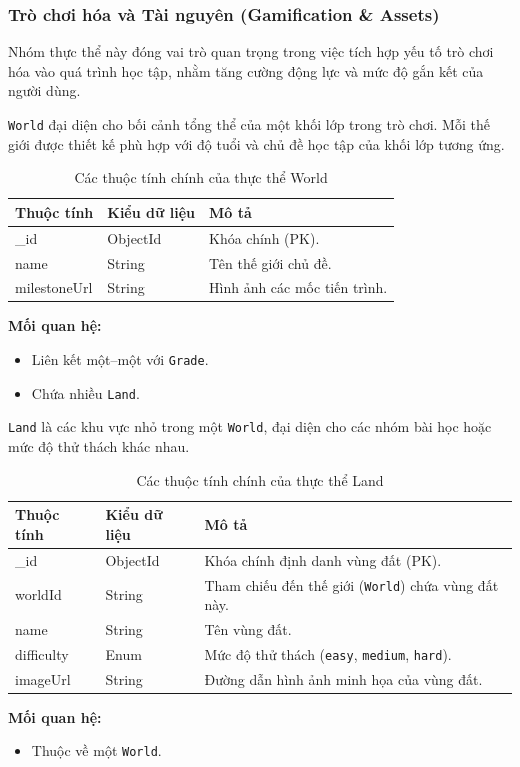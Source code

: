 \subsubsection{Trò chơi hóa và Tài nguyên (Gamification \& Assets)}

Nhóm thực thể này đóng vai trò quan trọng trong việc tích hợp yếu tố trò chơi hóa vào quá trình học tập, nhằm tăng cường động lực và mức độ gắn kết của người dùng.

\texttt{World} đại diện cho bối cảnh tổng thể của một khối lớp trong trò chơi. 
Mỗi thế giới được thiết kế phù hợp với độ tuổi và chủ đề học tập của khối lớp tương ứng.
\begin{table}[H]
	\centering
	\begin{tabularx}{\textwidth}{|l|l|X|}
		\hline
		\textbf{Thuộc tính} & \textbf{Kiểu dữ liệu} & \textbf{Mô tả} \\ \hline
		\_id & ObjectId & Khóa chính (PK). \\ \hline
		name & String & Tên thế giới chủ đề. \\ \hline
		milestoneUrl & String & Hình ảnh các mốc tiến trình. \\ \hline
	\end{tabularx}
	\caption{Các thuộc tính chính của thực thể World}
\end{table}
\newline
\textbf{Mối quan hệ:}
\begin{itemize}
	\item Liên kết một--một với \texttt{Grade}.
	\item Chứa nhiều \texttt{Land}.
\end{itemize}

\texttt{Land} là các khu vực nhỏ trong một \texttt{World}, đại diện cho các nhóm bài học hoặc mức độ thử thách khác nhau.
\begin{table}[H]
	\centering
	\begin{tabularx}{\textwidth}{|l|l|X|}
		\hline
		\textbf{Thuộc tính} & \textbf{Kiểu dữ liệu} & \textbf{Mô tả} \\ \hline
		\_id & ObjectId & Khóa chính định danh vùng đất (PK). \\ \hline
		worldId & String & Tham chiếu đến thế giới (\texttt{World}) chứa vùng đất này. \\ \hline
		name & String & Tên vùng đất. \\ \hline
		difficulty & Enum & Mức độ thử thách (\texttt{easy}, \texttt{medium}, \texttt{hard}). \\ \hline
		imageUrl & String & Đường dẫn hình ảnh minh họa của vùng đất. \\ \hline
	\end{tabularx}
	\caption{Các thuộc tính chính của thực thể Land}
\end{table}
\newline
\textbf{Mối quan hệ:}
\begin{itemize}
	\item Thuộc về một \texttt{World}.
\end{itemize}

